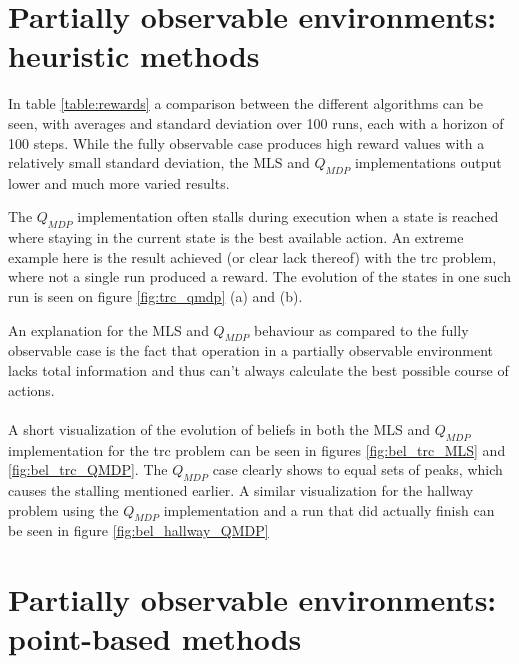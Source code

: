 \documentclass[10pt,a4paper]{article}
\begin{document}
\restoregeometry


\section{Partially observable environments: heuristic methods}

In table \ref{table:rewards} a comparison between the different algorithms can be seen, with averages and standard deviation over 100 runs, each with a horizon of 100 steps.
While the fully observable case produces high reward values with a relatively small standard deviation, the MLS and $Q_{MDP}$ implementations output lower and much more varied results.

The $Q_{MDP}$ implementation often stalls during execution when a state is reached where staying in the current state is the best available action.
An extreme example here is the result achieved (or clear lack thereof) with the trc problem, where not a single run produced a reward. The evolution of the states in one such run is seen on figure \ref{fig:trc_qmdp} (a) and (b).

An explanation for the MLS and $Q_{MDP}$ behaviour as compared to the fully observable case is the fact that operation in a partially observable environment lacks total information and thus can't always calculate the best possible course of actions.\\
\\
A short visualization of the evolution of beliefs in both the MLS and $Q_{MDP}$ implementation for the trc problem can be seen in figures \ref{fig:bel_trc_MLS} and \ref{fig:bel_trc_QMDP}.
The $Q_{MDP}$ case clearly shows to equal sets of peaks, which causes the stalling mentioned earlier.
A similar visualization for the hallway problem using the $Q_{MDP}$ implementation and a run that did actually finish can be seen in figure \ref{fig:bel_hallway_QMDP}


\section{Partially observable environments: point-based methods}
\end{document}
